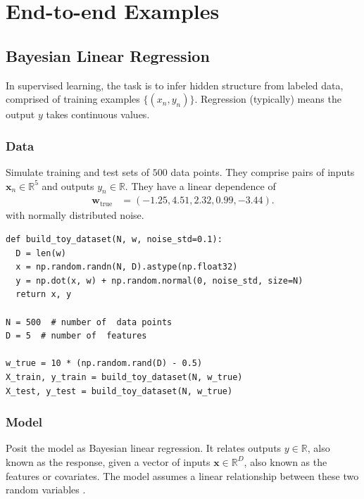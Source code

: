 \section{End-to-end Examples}
\label{sec:examples}

\subsection{Bayesian Linear Regression}

In supervised learning, the task is to infer hidden structure from
labeled data, comprised of training examples $\{(x_n, y_n)\}$.
Regression (typically) means the output $y$ takes continuous values.

\subsubsection{Data}

Simulate training and test sets of $500$ data points. They comprise
pairs of inputs $\mathbf{x}_n\in\mathbb{R}^{5}$ and outputs
$y_n\in\mathbb{R}$. They have a linear dependence of
\begin{align*}
  \mathbf{w}_{\text{true}}
  &=
  (-1.25, 4.51, 2.32, 0.99, -3.44).
\end{align*}
with normally distributed noise.

\begin{lstlisting}
def build_toy_dataset(N, w, noise_std=0.1):
  D = len(w)
  x = np.random.randn(N, D).astype(np.float32)
  y = np.dot(x, w) + np.random.normal(0, noise_std, size=N)
  return x, y

N = 500  # number of  data points
D = 5  # number of  features

w_true = 10 * (np.random.rand(D) - 0.5)
X_train, y_train = build_toy_dataset(N, w_true)
X_test, y_test = build_toy_dataset(N, w_true)
\end{lstlisting}

\subsubsection{Model}

Posit the model as Bayesian linear regression. It relates
outputs $y\in\mathbb{R}$, also known as the response, given
a vector of inputs
$\mathbf{x}\in\mathbb{R}^D$, also known as the features or covariates.
The model assumes a
linear relationship between these two random variables
\citep{murphy2012machine}.

